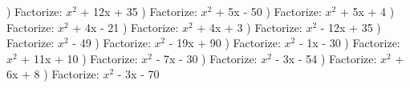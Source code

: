 \documentclass{article}%
\begin{document}
\newline%
) Factorize: $x^2$ + 12x + 35%
\newline%
\newline%
) Factorize: $x^2$ + 5x - 50%
\newline%
\newline%
) Factorize: $x^2$ + 5x + 4%
\newline%
\newline%
) Factorize: $x^2$ + 4x - 21%
\newline%
\newline%
) Factorize: $x^2$ + 4x + 3%
\newline%
\newline%
) Factorize: $x^2$ - 12x + 35%
\newline%
\newline%
) Factorize: $x^2$ - 49%
\newline%
\newline%
) Factorize: $x^2$ - 19x + 90%
\newline%
\newline%
) Factorize: $x^2$ - 1x - 30%
\newline%
\newline%
) Factorize: $x^2$ + 11x + 10%
\newline%
\newline%
) Factorize: $x^2$ - 7x - 30%
\newline%
\newline%
) Factorize: $x^2$ - 3x - 54%
\newline%
\newline%
) Factorize: $x^2$ + 6x + 8%
\newline%
\newline%
) Factorize: $x^2$ - 3x - 70%
\newline%
\newline%
\newline%
\end{document}
